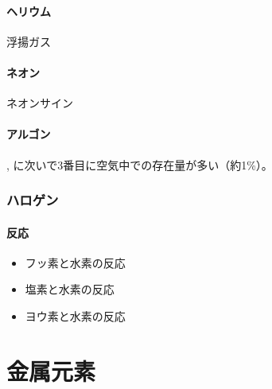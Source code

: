 \documentclass[dvipdfmx,a4paper,twocolumn]{jsarticle}
\newcommand{\shl}[1]{{\bfseries #1}}
\begin{document}
  \subsection{ヘリウム }
  浮揚ガス
  \subsection{ネオン }
  ネオンサイン
  \subsection{アルゴン }
  , に次いで3番目に空気中での存在量が多い（約1\%）。
 \section{ハロゲン}
  \subsection{反応}
    \begin{itemize}
   \item フッ素と水素の反応\\
   \shl{}
   \item 塩素と水素の反応\\
   \shl{}
   \item ヨウ素と水素の反応\\
   \shl{}
  \end{itemize}
 \newpage
 \part{金属元素}
\end{document}
